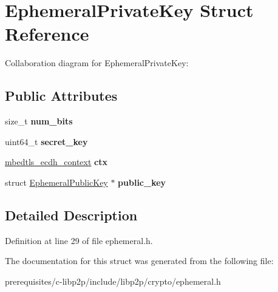 \hypertarget{struct_ephemeral_private_key}{}\section{Ephemeral\+Private\+Key Struct Reference}
\label{struct_ephemeral_private_key}


Collaboration diagram for Ephemeral\+Private\+Key\+:
\subsection*{Public Attributes}
\begin{DoxyCompactItemize}
\item 
\mbox{\label{struct_ephemeral_private_key_a53988da60c39ebb68f9d55895a6e924c}} 
size\+\_\+t {\bfseries num\+\_\+bits}
\item 
\mbox{\label{struct_ephemeral_private_key_a3a02bced66e45f0b00e7a0dc6b8b3859}} 
uint64\+\_\+t {\bfseries secret\+\_\+key}
\item 
\mbox{\label{struct_ephemeral_private_key_a13837e048a1cce92c5cd891d56e84be0}} 
\mbox{\hyperlink{structmbedtls__ecdh__context}{mbedtls\+\_\+ecdh\+\_\+context}} {\bfseries ctx}
\item 
\mbox{\label{struct_ephemeral_private_key_a8523fb320fc1dd6729d223fc169472ce}} 
struct \mbox{\hyperlink{struct_ephemeral_public_key}{Ephemeral\+Public\+Key}} $\ast$ {\bfseries public\+\_\+key}
\end{DoxyCompactItemize}


\subsection{Detailed Description}


Definition at line 29 of file ephemeral.\+h.



The documentation for this struct was generated from the following file\+:\begin{DoxyCompactItemize}
\item 
prerequisites/c-\/libp2p/include/libp2p/crypto/ephemeral.\+h\end{DoxyCompactItemize}
